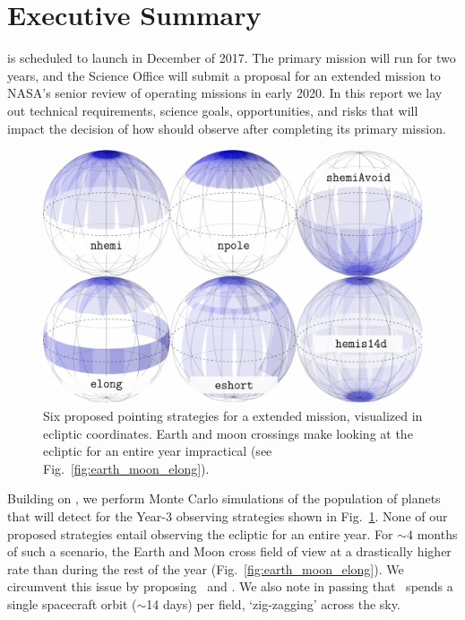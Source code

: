 \newpage
\section{Executive Summary}

\tess is scheduled to launch in December of 2017.
The primary mission will run for two years, and the \tess Science
Office will submit a proposal for an extended mission to NASA's senior
review of operating missions in early 2020.  In this report we lay out
technical requirements, science goals, opportunities, and risks that
will impact the decision of how \tess should observe after completing
its primary mission.

\begin{figure}[!b]
	\includegraphics{figures/proposed_pointings_texttt.pdf}
	\caption{Six proposed pointing strategies for a \tess extended mission, visualized in ecliptic coordinates.
	Earth and moon crossings make looking at the ecliptic for an entire year impractical (see Fig.~\protect\ref{fig:earth_moon_elong}).}
	\label{fig:strategies}
\end{figure}

Building on \citet{Sullivan_2015}, we perform Monte Carlo simulations of the population of planets that \tess will detect for the Year-3 observing strategies shown in Fig.~\ref{fig:strategies}.
None of our proposed strategies entail observing the ecliptic for an entire year.
For $\sim\!4$ months of such a scenario, the Earth and Moon cross \tesss field of view at a drastically higher rate than during the rest of the year (Fig.~\ref{fig:earth_moon_elong}).
We circumvent this issue by proposing \elong\ and \eshort.
We also note in passing that \hemis\ spends a single spacecraft orbit ($\sim$14 days) per field, `zig-zagging' across the sky.


